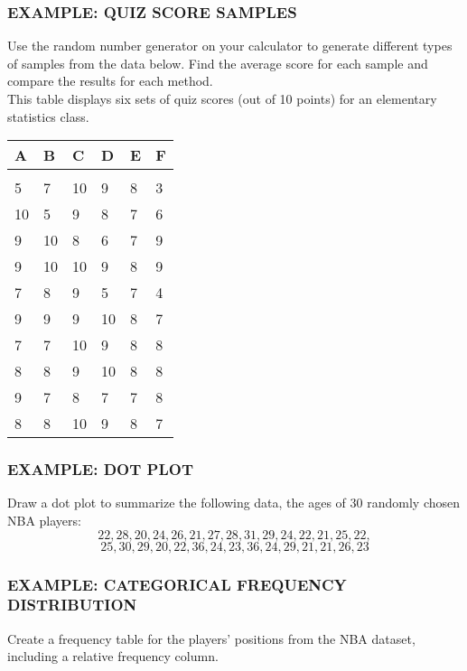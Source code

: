 \documentclass[8pt]{beamer}
\newcommand{\extitle}[1]{\frametitle{\fontfamily{fvs}\selectfont \small\color{black!70!blue!80!cyan}\uppercase{\bfseries Example: #1}}}
\newenvironment{exsol}
{
\begin{tcolorbox}[colframe=black!50!blue!50!cyan,
colback=white,
bottomrule=0mm,
rightrule=0mm,
sharp corners=all] 

}
{ \end{tcolorbox}}
\begin{document}
\begin{frame}
\extitle{Quiz Score Samples}
Use the random number generator on your calculator to generate different types of samples from the data below.  Find the average score for each sample and compare the results for each method.\\

This table displays six sets of quiz scores (out of 10 points) for an elementary statistics class.
\begin{center}
\begin{tabular}{l l l l l l}
A & B & C & D & E & F\\
\hline
& & & & & \\
5 & 7 & 10 & 9 & 8 & 3\\
10 & 5 & 9 & 8 & 7 & 6\\
9 & 10 & 8 & 6 & 7 & 9\\
9 & 10 & 10 & 9 & 8 & 9\\
7 & 8 & 9 & 5 & 7 & 4\\
9 & 9 & 9 & 10 & 8 & 7\\
7 & 7 & 10 & 9 & 8 & 8\\
8 & 8 & 9 & 10 & 8 & 8\\
9 & 7 & 8 & 7 & 7 & 8\\
8 & 8 & 10 & 9 & 8 & 7\\
\end{tabular}
\end{center}

\begin{exsol}
\vspace{3in}
\text{}
\end{exsol}
\end{frame}

\begin{frame}
\extitle{Dot Plot}
Draw a dot plot to summarize the following data, the ages of 30 randomly chosen NBA players:
\[22, 28, 20, 24, 26, 21, 27, 28, 31, 29, 24, 22, 21, 25, 22,\]
\[25, 30, 29, 20, 22, 36, 24, 23, 36, 24, 29, 21, 21, 26, 23\]

\begin{exsol}
\vspace{3in}
\text{}
\end{exsol}
\end{frame}

\begin{frame}
\extitle{Categorical Frequency Distribution}
Create a frequency table for the players' positions from the NBA dataset, including a relative frequency column.

\begin{exsol}
\vspace{3in}
\text{}
\end{exsol}
\end{frame}
\end{document}
